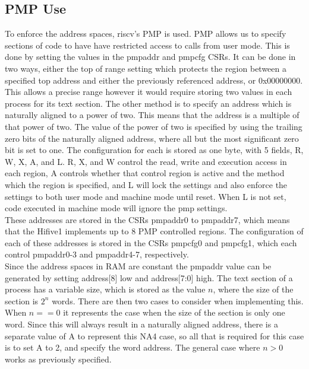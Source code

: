 \subsection{PMP Use}
To enforce the address spaces, \gls{riscv}'s PMP is used. PMP allows us to specify sections of code to have have restricted access to calls from user mode. This is done by setting the values in the pmpaddr and pmpcfg CSRs. It can be done in two ways, either the top of range setting which protects the region between a specified top address and either the previously referenced address, or 0x00000000. This allows a precise range however it would require storing two values in each process for its text section. The other method is to specify an address which is naturally aligned to a power of two. This means that the address is a multiple of that power of two. The value of the power of two is specified by using the trailing zero bits of the naturally aligned address, where all but the most significant zero bit is set to one. The configuration for each is stored as one byte, with 5 fields, R, W, X, A, and L. R, X, and W control the read, write and execution access in each region, A controls whether that control region is active and the method which the region is specified, and L will lock the settings and also enforce the settings to both user mode and machine mode until reset. When L is not set, code executed in machine mode will ignore the \ac{pmp} settings.\\
These addresses are stored in the CSRs pmpaddr0 to pmpaddr7, which means that the Hifive1 implements up to 8 PMP controlled regions. The configuration of each of these addresses is stored in the CSRs pmpcfg0 and pmpcfg1, which each control pmpaddr0-3 and pmpaddr4-7, respectively.\\
Since the address spaces in RAM are constant the pmpaddr value can be generated by setting address[8] low and address[7:0] high. The text section of a process has a variable size, which is stored as the value \(n\), where the size of the section is \(2^n\) words. There are then two cases to consider when implementing this. When \(n == 0\) it represents the case when the size of the section is only one word. Since this will always result in a naturally aligned address, there is a separate value of A to represent this NA4 case, so all that is required for this case is to set A to 2, and specify the word address. The general case where \(n > 0\) works as previously specified. 
